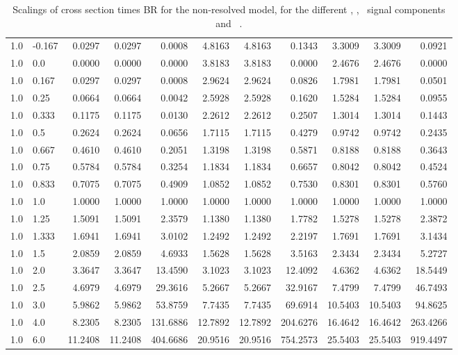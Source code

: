 \begin{landscape}
\begin{table}[h!]
\begin{tabular}{ll rrr rrr rrr}
   1.0 & -0.167 & 0.0297  & 0.0297  & 0.0008   & 4.8163  & 4.8163  & 0.1343    & 3.3009  & 3.3009  & 0.0921 \\
   1.0 & 0.0    & 0.0000  & 0.0000  & 0.0000   & 3.8183  & 3.8183  & 0.0000    & 2.4676  & 2.4676  & 0.0000 \\
   1.0 & 0.167  & 0.0297  & 0.0297  & 0.0008   & 2.9624  & 2.9624  & 0.0826    & 1.7981  & 1.7981  & 0.0501 \\
   1.0 & 0.25   & 0.0664  & 0.0664  & 0.0042   & 2.5928  & 2.5928  & 0.1620    & 1.5284  & 1.5284  & 0.0955 \\
   1.0 & 0.333  & 0.1175  & 0.1175  & 0.0130   & 2.2612  & 2.2612  & 0.2507    & 1.3014  & 1.3014  & 0.1443 \\
   1.0 & 0.5    & 0.2624  & 0.2624  & 0.0656   & 1.7115  & 1.7115  & 0.4279    & 0.9742  & 0.9742  & 0.2435 \\
   1.0 & 0.667  & 0.4610  & 0.4610  & 0.2051   & 1.3198  & 1.3198  & 0.5871    & 0.8188  & 0.8188  & 0.3643 \\
   1.0 & 0.75   & 0.5784  & 0.5784  & 0.3254   & 1.1834  & 1.1834  & 0.6657    & 0.8042  & 0.8042  & 0.4524 \\
   1.0 & 0.833  & 0.7075  & 0.7075  & 0.4909   & 1.0852  & 1.0852  & 0.7530    & 0.8301  & 0.8301  & 0.5760 \\
   1.0 & 1.0    & 1.0000  & 1.0000  & 1.0000   & 1.0000  & 1.0000  & 1.0000    & 1.0000  & 1.0000  & 1.0000 \\
   1.0 & 1.25   & 1.5091  & 1.5091  & 2.3579   & 1.1380  & 1.1380  & 1.7782    & 1.5278  & 1.5278  & 2.3872 \\
   1.0 & 1.333  & 1.6941  & 1.6941  & 3.0102   & 1.2492  & 1.2492  & 2.2197    & 1.7691  & 1.7691  & 3.1434 \\
   1.0 & 1.5    & 2.0859  & 2.0859  & 4.6933   & 1.5628  & 1.5628  & 3.5163    & 2.3434  & 2.3434  & 5.2727 \\
   1.0 & 2.0    & 3.3647  & 3.3647  & 13.4590  & 3.1023  & 3.1023  & 12.4092   & 4.6362  & 4.6362  & 18.5449 \\
   1.0 & 2.5    & 4.6979  & 4.6979  & 29.3616  & 5.2667  & 5.2667  & 32.9167   & 7.4799  & 7.4799  & 46.7493 \\
   1.0 & 3.0    & 5.9862  & 5.9862  & 53.8759  & 7.7435  & 7.7435  & 69.6914   & 10.5403 & 10.5403 & 94.8625 \\
   1.0 & 4.0    & 8.2305  & 8.2305  & 131.6886 & 12.7892 & 12.7892 & 204.6276  & 16.4642 & 16.4642 & 263.4266 \\
   1.0 & 6.0    & 11.2408 & 11.2408 & 404.6686 & 20.9516 & 20.9516 & 754.2573  & 25.5403 & 25.5403 & 919.4497 \\\hline
  \end{tabular}
  \caption[Scalings of $\sigma\times$BR for the signal components and \ ]{Scalings of cross section times BR for the non-resolved model, for the different \ttH, \tHq, \tHW\ signal components and \ .}\label{tab:xsbrscalingK6_1}
\end{table}


\end{landscape}
